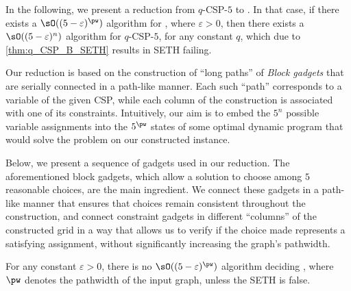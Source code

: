 In the following, we present a reduction from $q$-CSP-$5$ to \AcyclicM.
In that case, if there exists a $\sO ((5 - \varepsilon)^\pw)$ algorithm for \AcyclicM,
where $\varepsilon > 0$,
then there exists a $\sO ((5 - \varepsilon)^n)$ algorithm for $q$-CSP-$5$,
for any constant $q$,
which due to \cref{thm:q_CSP_B_SETH} results in SETH failing.

Our reduction is based on the construction of ``long paths'' of \emph{Block gadgets}
that are serially connected in a path-like manner.
Each such ``path'' corresponds to a variable of the given CSP,
while each column of the construction is associated with one of its constraints.
Intuitively, our aim is to embed the $5^n$ possible variable assignments into the $5^\pw$ states of some optimal
dynamic program that would solve the problem on our constructed instance.

Below, we present a sequence of gadgets used in our reduction.
The aforementioned block gadgets,
which allow a solution to choose among $5$ reasonable choices,
are the main ingredient.
We connect these gadgets in a path-like manner that ensures that choices remain consistent throughout the construction,
and connect constraint gadgets in different ``columns'' of the constructed grid in a way that allows us to verify if
the choice made represents a satisfying assignment,
without significantly increasing the graph's pathwidth.

\begin{theoremrep}
    For any constant $\varepsilon > 0$,
    there is no $\sO((5-\varepsilon)^\pw)$ algorithm deciding \AcyclicM,
    where $\pw$ denotes the pathwidth of the input graph,
    unless the SETH is false.
\end{theoremrep}

